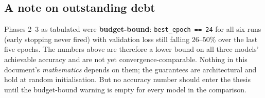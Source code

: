 \documentclass[11pt,a4paper]{article}
\theoremstyle{plain}
\theoremstyle{definition}
\theoremstyle{remark}
\newcommand{\code}[1]{\texttt{\small #1}}
\begin{document}
\subsection*{A note on outstanding debt}

Phases 2--3 as tabulated were \textbf{budget-bound}: \code{best\_epoch == 24} for all six
runs (early stopping never fired) with validation loss still falling $26$--$50\%$ over the
last five epochs. The numbers above are therefore a lower bound on all three models'
achievable accuracy and are not yet convergence-comparable. Nothing in this document's
\emph{mathematics} depends on them; the guarantees are architectural and hold at random
initialisation. But no accuracy number should enter the thesis until the budget-bound
warning is empty for every model in the comparison.
\end{document}
